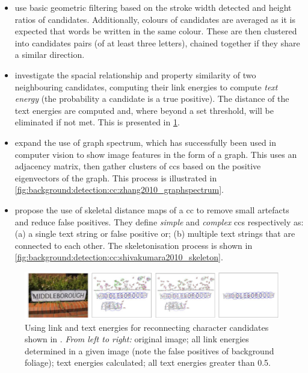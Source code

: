\begin{itemize}
  \item \citet{Epshtein:2010tj} use basic geometric filtering based on the stroke width detected and height ratios of candidates. Additionally, colours of candidates are averaged as it is expected that words be written in the same colour. These are then clustered into candidates pairs (of at least three letters), chained together if they share a similar direction.
  \item \citet{Zhang:2011cl} investigate the spacial relationship and property similarity of two neighbouring candidates, computing their link energies to compute \textit{text energy} (the probability a candidate is a true positive). The distance of the text energies are computed and, where beyond a set threshold, will be eliminated if not met. This is presented in \cref{fig:background:detection:cc:zhang2011_textenergy}.
  \item \citet{Zhang:2010wa} expand the use of graph spectrum, which has successfully been used in computer vision \citep{Sarkar:1996ig} to show image features in the form of a graph. This uses an adjacency matrix, then gather clusters of \glspl{cc} based on the positive eigenvectors of the graph. This process is illustrated in \cref{fig:background:detection:cc:zhang2010_graphspectrum}.
  \item \citet{Shivakumara:2011dn} propose the use of skeletal distance maps of a \gls{cc} to remove small artefacts and reduce false positives. They define \textit{simple} and \textit{complex} \glspl{cc} respectively as: (a) a single text string or false positive or; (b) multiple text strings that are connected to each other. The skeletonisation process is shown in \cref{fig:background:detection:cc:shivakumara2010_skeleton}.
\end{itemize}
 
\begin{figure}[p!]
  \centering
  \includegraphics[width=\textwidth]{images/background/zhang2011_textenergy}
  \caption[Text energy for connecting candidates back together]{Using link and text energies for reconnecting character candidates shown in \citet{Zhang:2011cl}. \textit{From left to right:} original image; all link energies determined in a given image (note the false positives of background foliage); text energies calculated; all text energies greater than 0.5.}
  \label{fig:background:detection:cc:zhang2011_textenergy}
\end{figure}

